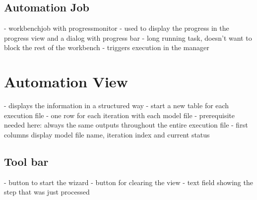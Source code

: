 \subsection{Automation Job}
- workbenchjob with progressmonitor
- used to display the progress in the progress view and a dialog with progress bar
- long running task, doesn't want to block the rest of the workbench 
- triggers execution in the manager

\section{Automation View}
\label{section:AutoView}
- displays the information in a structured way
- start a new table for each execution file
- one row for each iteration with each model file
 - prerequisite needed here: always the same outputs throughout the entire execution file
- first columns display model file name, iteration index and current status

\subsection{Tool bar}
- button to start the wizard
- button for clearing the view
- text field showing the step that was just processed
